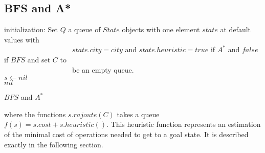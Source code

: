 \documentclass[11pt]{article}
\begin{document}
\subsection{BFS and A*}
\begin{algorithm}[H]
	\SetAlgoLined
	initialization: Set $Q$ a queue of $State$ objects with one element $state$ at default values with\\  
	\ \ \ \ \ \ \ \ \ \ \ \ \ \ \ \ \ \ \ $state.city = city$ and $state.heuristic = true$ if $A^*$ and $false$ if $BFS$ and set $C$ to\\ \ \ \ \ \ \ \ \ \ \ \ \ \ \ \ \ \ \ \ be an empty queue.\\
	$s\leftarrow nil$\\
	\Return $nil$   \caption{$BFS$ and $A^*$}
\end{algorithm}
where the functions $s.rajoute(C)$ takes a queue  $f(s) = s.cost + s.heuristic()$. This heuristic function represents an estimation of the minimal cost of operations needed to get to a goal state. It is described exactly in the following section.
\end{document}
